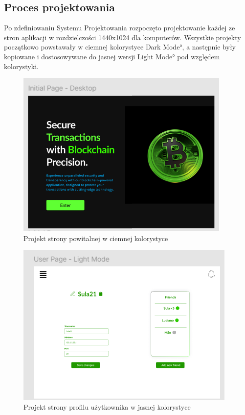 \subsection{Proces projektowania}
\label{sec:ProcesProjektowania}
Po zdefiniowaniu Systemu Projektowania rozpoczęto projektowanie każdej ze stron aplikacji w rozdzielczości 1440x1024 dla komputerów. Wszystkie projekty początkowo powstawały w ciemnej kolorystyce \ang{Dark Mode}, a następnie były kopiowane i dostosowywane do jasnej wersji \ang{Light Mode} pod względem kolorystyki.
\begin{figure}[!ht]
    \centering
    \includegraphics[width=0.75\linewidth]{Images/figma_projektowanie_1.png}
    \caption{Projekt strony powitalnej w ciemnej kolorystyce}
    \label{fig:enter-label}
\end{figure}
\begin{figure}[!ht]
    \centering
    \includegraphics[width=0.75\linewidth]{Images/figma_projektowanie_2.png}
    \caption{Projekt strony profilu użytkownika w jasnej kolorystyce}
    \label{fig:enter-label}
\end{figure}
